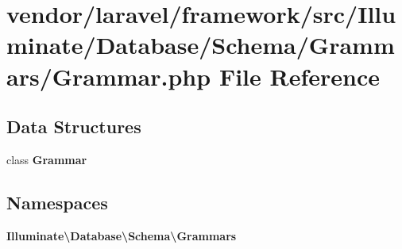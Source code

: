 \section{vendor/laravel/framework/src/\+Illuminate/\+Database/\+Schema/\+Grammars/\+Grammar.php File Reference}
\label{laravel_2framework_2src_2_illuminate_2_database_2_schema_2_grammars_2_grammar_8php}
\subsection*{Data Structures}
\begin{DoxyCompactItemize}
\item 
class {\bf Grammar}
\end{DoxyCompactItemize}
\subsection*{Namespaces}
\begin{DoxyCompactItemize}
\item 
 {\bf Illuminate\textbackslash{}\+Database\textbackslash{}\+Schema\textbackslash{}\+Grammars}
\end{DoxyCompactItemize}
